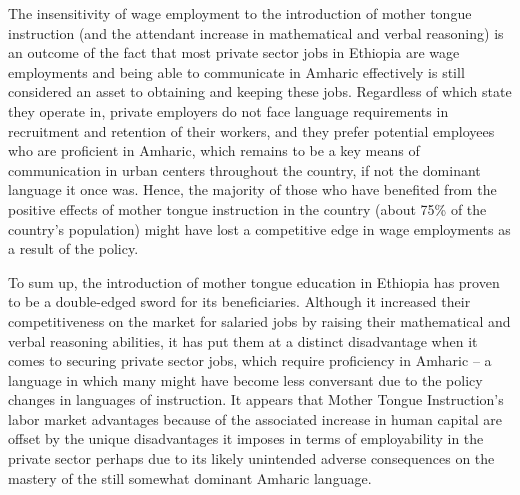 The insensitivity of wage employment to the introduction of mother tongue instruction (and the attendant increase in mathematical and verbal reasoning) is an outcome of the fact that most private sector jobs in Ethiopia are wage employments and being able to communicate in Amharic effectively is still considered an asset to obtaining and keeping these jobs. Regardless of which state they operate in, private employers do not face language requirements in recruitment and retention of their workers, and they prefer potential employees who are proficient in Amharic, which remains to be a key means of communication in urban centers throughout the country, if not the dominant language it once was. Hence, the majority of those who have benefited from the positive effects of mother tongue instruction in the country (about 75\% of the country’s population) might have lost a competitive edge in wage employments as a result of the policy.

To sum up, the introduction of mother tongue education in Ethiopia has proven to be a double-edged sword for its beneficiaries. Although it increased their competitiveness on the market for salaried jobs by raising their mathematical and verbal reasoning abilities, it has put them at a distinct disadvantage when it comes to securing private sector jobs, which require proficiency in Amharic – a language in which many might have become less conversant due to the policy changes in languages of instruction. It appears that Mother Tongue Instruction’s labor market advantages because of the associated increase in human capital are offset by the unique disadvantages it imposes in terms of employability in the private sector perhaps due to its likely unintended adverse consequences on the mastery of the still somewhat dominant Amharic language.



